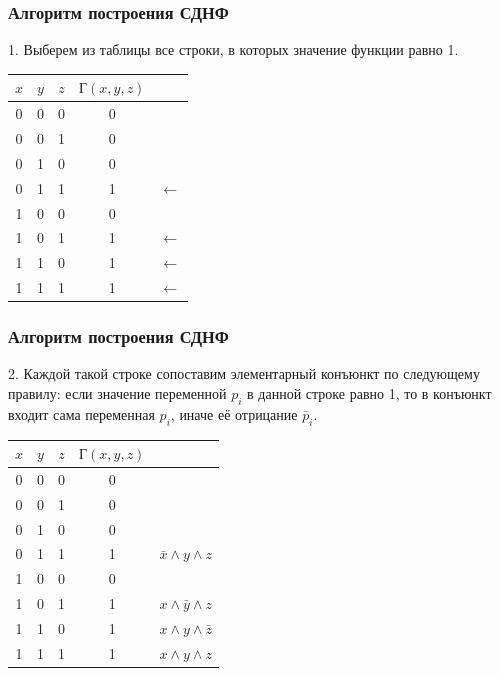 \begin{frame}
\frametitle{Алгоритм построения СДНФ}

1. Выберем из таблицы все строки, в которых значение функции равно 1. 

\medskip
\begin{tabular}{|c|c|c||c|l}
  \hline
  $x$  & $y$ & $z$ & $Г(x,y,z)$ & \\
  \hline
   0   & 0 & 0 &  0 &  \\
   0   & 0 & 1 &  0 &  \\
   0   & 1 & 0 &  0 &  \\
   0   & 1 & 1 &  1 & $\leftarrow$ \\
   1   & 0 & 0 &  0 &  \\
   1   & 0 & 1 &  1 & $\leftarrow$ \\
   1   & 1 & 0 &  1 & $\leftarrow$\\
   1   & 1 & 1 &  1 & $\leftarrow$\\
  \hline
\end{tabular}

\end{frame}

\begin{frame}
\frametitle{Алгоритм построения СДНФ}

2. Каждой такой строке сопоставим элементарный конъюнкт по следующему правилу: если значение переменной $p_i$ в данной строке равно 1, то в конъюнкт входит сама переменная $p_i$, иначе её отрицание $\bar{p}_i$.

\medskip
\begin{tabular}{|c|c|c||c|l}
  \hline
  $x$  & $y$ & $z$ & $Г(x,y,z)$ & \\
  \hline
   0   & 0 & 0 &  0 &  \\
   0   & 0 & 1 &  0 &  \\
   0   & 1 & 0 &  0 &  \\
   0   & 1 & 1 &  1 & $\bar{x}\wedge y \wedge z $ \\
   1   & 0 & 0 &  0 &  \\
   1   & 0 & 1 &  1 & $x\wedge \bar{y} \wedge z$ \\
   1   & 1 & 0 &  1 & $x\wedge y \wedge \bar{z}$\\
   1   & 1 & 1 &  1 & $x\wedge y \wedge z$\\
  \hline
\end{tabular}


\end{frame}

